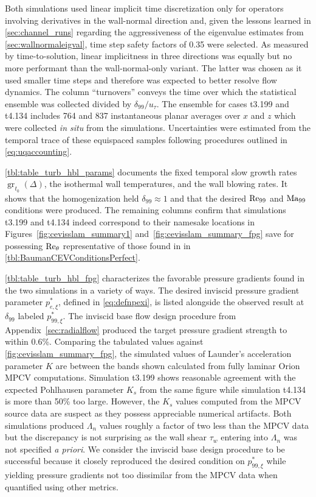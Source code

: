 Both simulations used linear implicit time discretization only for
operators involving derivatives in the wall-normal direction and,
given the lessons learned in \autoref{sec:channel_runs} regarding the
aggressiveness of the eigenvalue estimates from \autoref{sec:wallnormaleigval},
time step safety factors of 0.35 were selected.  As measured by
time-to-solution, linear implicitness in three directions was equally but no
more performant than the wall-normal-only variant.  The latter was chosen as it
used smaller time steps and therefore was expected to better resolve flow
dynamics.  The column ``turnovers'' conveys the time over which the statistical
ensemble was collected divided by $\delta_{99}/u_\tau$.  The ensemble for cases
t3.199 and t4.134 includes 764 and 837 instantaneous planar averages over $x$
and $z$ which were collected \emph{in situ} from the simulations.  Uncertainties
were estimated from the temporal trace of these equispaced samples following
procedures outlined in \autoref{eq:uqaccounting}.

\autoref{tbl:table_turb_hbl_params} documents the fixed temporal slow growth
rates $\operatorname{gr}_{t_0}\!\left(\Delta\right)$, the isothermal wall
temperatures, and the wall blowing rates.  It shows that the homogenization held
$\delta_{99} \approx 1$ and that the desired $\Reynolds[99]$ and $\Mach[99]$
conditions were produced.  The remaining columns confirm that simulations t3.199
and t4.134 indeed correspond to their namesake locations in
Figures~\ref{fig:cevisslam_summary1} and~\ref{fig:cevisslam_summary_fpg} save
for possessing $\Reynolds[\theta]$ representative of those found in in
\autoref{tbl:BaumanCEVConditionsPerfect}.

\autoref{tbl:table_turb_hbl_fpg} characterizes the favorable pressure gradients
found in the two simulations in a variety of ways.  The desired
inviscid pressure gradient parameter $p_{e,\xi}^\ast$, defined in \eqref{eq:defnpexi},
is listed alongside the observed result at $\delta_{99}$ labeled
$p_{99,\xi}^{\ast}$.  The inviscid base flow design procedure from
Appendix~\ref{sec:radialflow} produced the target pressure gradient strength to
within 0.6\%.  Comparing the tabulated values against
\autoref{fig:cevisslam_summary_fpg}, the simulated values of Launder's
acceleration parameter $K$ are between the bands shown calculated from fully
laminar Orion MPCV computations.  Simulation t3.199 shows reasonable agreement
with the expected Pohlhausen parameter $K_s$ from the same figure while
simulation t4.134 is more than 50\% too large.  However, the $K_s$ values
computed from the MPCV source data are suspect as they possess appreciable numerical
artifacts.  Both simulations produced $\Lambda_n$ values roughly a factor of two
less than the MPCV data but the discrepancy is not surprising as the wall shear
$\tau_w$ entering into $\Lambda_n$ was not specified \emph{a priori}.
We consider the inviscid base design procedure to be successful because it
closely reproduced the desired condition on $p_{99,\xi}^\ast$ while yielding
pressure gradients not too dissimilar from the MPCV data when quantified using
other metrics.

